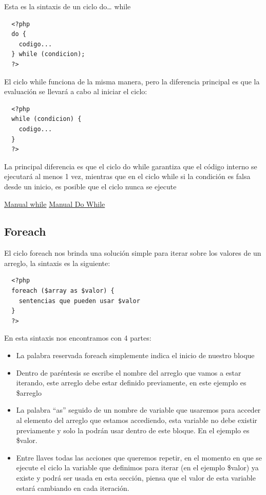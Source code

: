 \documentclass{article}
\begin{document}
Esta es la sintaxis de un ciclo do… while\\

\begin{verbatim}
  <?php
  do {
    codigo...
  } while (condicion);
  ?>
\end{verbatim}

El ciclo while funciona de la misma manera, pero la diferencia principal es que
la evaluación se llevará a cabo al iniciar el ciclo:\\

\begin{verbatim}
  <?php
  while (condicion) {
    codigo...
  }
  ?>
\end{verbatim}

La principal diferencia es que el ciclo do while garantiza que el código
interno se ejecutará al menos 1 vez, mientras que en el ciclo while si la
condición es falsa desde un inicio, es posible que el ciclo nunca se ejecute

\href{http://php.net/manual/es/control-structures.while.php}{Manual while}
\href{http://php.net/manual/es/control-structures.do.while.php}{Manual Do While}

\subsection*{Foreach}%
El ciclo foreach nos brinda una solución simple para iterar sobre los valores
de un arreglo, la sintaxis es la siguiente:\\

\begin{verbatim}
  <?php
  foreach ($array as $valor) {
    sentencias que pueden usar $valor
  }
  ?>
\end{verbatim}

En esta sintaxis nos encontramos con 4 partes:

\begin{itemize}
  \item La palabra reservada foreach simplemente indica el inicio de nuestro bloque
  \item Dentro de paréntesis se escribe el nombre del arreglo que vamos a estar
    iterando, este arreglo debe estar definido previamente, en este ejemplo es
    \$arreglo
  \item La palabra “as” seguido de un nombre de variable que usaremos para
    acceder al elemento del arreglo que estamos accediendo, esta variable no
    debe existir previamente y solo la podrán usar dentro de este bloque. En el
    ejemplo es \$valor.
  \item Entre llaves todas las acciones que queremos repetir, en el momento en
    que se ejecute el ciclo la variable que definimos para iterar (en el
    ejemplo \$valor) ya existe y podrá ser usada en esta sección, piensa que el
    valor de esta variable estará cambiando en cada iteración.
\end{itemize}
\end{document}
